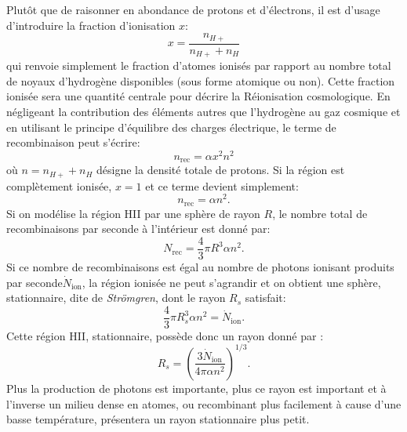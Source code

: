 Plutôt que de raisonner en abondance de protons et d'électrons, il est d'usage d'introduire la fraction d'ionisation $x$:
\begin{equation}
x=\frac{n_{H+}}{n_{H+}+n_H}
\end{equation}
qui renvoie simplement le fraction d'atomes ionisés par rapport au nombre total de noyaux d'hydrogène disponibles (sous forme atomique ou non). Cette fraction ionisée sera une quantité centrale pour décrire la Réionisation cosmologique. En négligeant la contribution des éléments autres que l'hydrogène au gaz cosmique et en utilisant le principe d'équilibre des charges électrique, le terme de recombinaison peut s'écrire:
\begin{equation}
n_\mathrm{rec}=\alpha x^2 n^2
\end{equation}
où $n=n_{H+}+n_H$ désigne la densité totale de protons. Si la région est complètement ionisée, $x=1$ et ce terme devient simplement:
\begin{equation}
n_\mathrm{rec}=\alpha n^2.
\end{equation}
Si on modélise la région HII par une sphère de rayon $R$, le nombre total de recombinaisons par seconde à l'intérieur est donné par:
\begin{equation}
N_\mathrm{rec}=\frac{4}{3}\pi R^3\alpha n^2.
\end{equation}
Si ce nombre de recombinaisons est égal au nombre de photons ionisant produits par seconde$ \dot N_\mathrm{ion}$, la région ionisée ne peut s'agrandir et on obtient une sphère, stationnaire, dite de \textit{Strömgren}, dont le rayon $R_s$ satisfait:
\begin{equation}
\frac{4}{3}\pi R_s^3\alpha n^2=\dot N_\mathrm{ion}.
\end{equation}
Cette région HII, stationnaire, possède donc un rayon donné par :
\begin{equation}
R_s=\left(\frac{3 \dot N_\mathrm{ion}}{4\pi \alpha n^2}\right)^{1/3}.
\end{equation}
Plus la production de photons est importante, plus ce rayon est important et à l'inverse un milieu dense en atomes, ou recombinant plus facilement à cause d'une basse température, présentera un rayon stationnaire plus petit.

